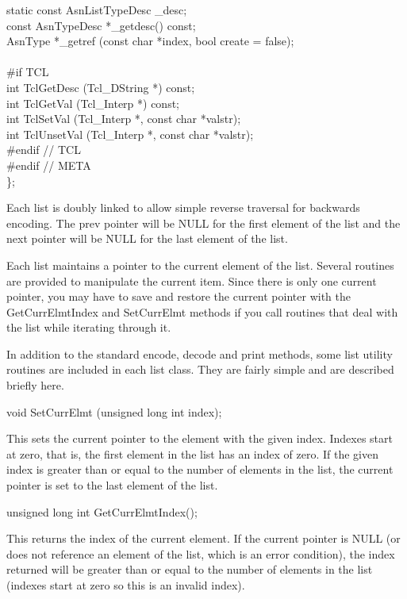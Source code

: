 \begin{Ccode}
  static const AsnListTypeDesc  \>\>\_desc;\\
  const AsnTypeDesc             \>\>*\_getdesc() const;\\
  AsnType                       \>\>*\_getref (const char *index, bool create = false);\\
\\
\<\#if TCL\\
  int                   \>\>TclGetDesc (Tcl\_DString *) const;\\
  int                   \>\>TclGetVal (Tcl\_Interp *) const;\\
  int                   \>\>TclSetVal (Tcl\_Interp *, const char *valstr);\\
  int                   \>\>TclUnsetVal (Tcl\_Interp *, const char *valstr);\\
\<\#endif // TCL\\
\<\#endif // META\\
\<\};
\end{Ccode}

Each list is doubly linked to allow simple reverse traversal for
backwards encoding.  The {\C prev} pointer will be {\C NULL} for the
first element of the list and the {\C next} pointer will be {\C NULL} for
the last element of the list.

Each list maintains a pointer to the current element of the list.
Several routines are provided to manipulate the current item.  Since
there is only one current pointer, you may have to save and restore
the current pointer with the {\C GetCurrElmtIndex} and
{\C SetCurrElmt} methods if you call routines that deal with the
list while iterating through it.

In addition to the standard encode, decode and print methods, some
list utility routines are included in each list class.  They are
fairly simple and are described briefly here.

\begin{Ccode}
void \>\>\>SetCurrElmt (unsigned long int index);
\end{Ccode}
This sets the current pointer to the element with the given index.
Indexes start at zero, that is, the first element in the list has an
index of zero.  If the given index is greater than or equal to the
number of elements in the list, the current pointer is set to the last
element of the list.

\begin{Ccode}
unsigned long int \>\>\>GetCurrElmtIndex();
\end{Ccode}
This returns the index of the current element.  If the current pointer
is {\C NULL} (or does not reference an element of the list, which is an
error condition), the index returned will be greater than or equal to
the number of elements in the list (indexes start at zero so this is
an invalid index).


